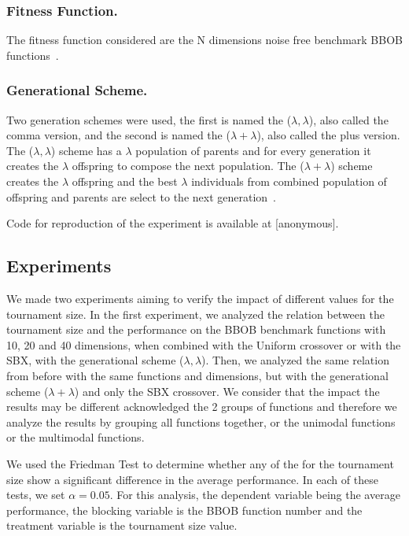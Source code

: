 \subsubsection*{Fitness Function.}
The fitness function considered are the N dimensions noise free benchmark BBOB functions~\cite{hansen2010real}.





\subsubsection*{Generational Scheme.}
Two generation schemes were used, the first is named the ($\lambda, \lambda$), also called the comma version, and the second is named the ($\lambda + \lambda$), also called the plus version. The ($\lambda, \lambda$) scheme has a $\lambda$ population of parents and for every generation it creates the $\lambda$ offspring to compose the next population. The ($\lambda + \lambda$) scheme creates the $\lambda$ offspring and the best $\lambda$ individuals from combined population of offspring and parents are select to the next generation~\cite{pilat2017parallel}.

Code for reproduction of the experiment is available at [anonymous].

\subsection{Experiments}\label{sec:experiment}
We made two experiments aiming to verify the impact of different values for the tournament size. In the first experiment, we analyzed the relation between the tournament size and the performance on the BBOB benchmark functions with 10, 20 and 40 dimensions, when combined with the Uniform crossover or with the SBX, with the generational scheme  ($\lambda, \lambda$). Then, we analyzed the same relation from before with the same functions and dimensions, but with the generational scheme  ($\lambda + \lambda$) and only the SBX crossover. We consider that the impact the results may be different acknowledged the 2 groups of functions and therefore we analyze the results by grouping all functions together, or the unimodal functions or the multimodal functions. 

We used the Friedman Test to determine whether any of the for the tournament size show a significant difference in the average performance. In each of these tests, we set $\alpha = 0.05$. For this analysis, the dependent variable being the average performance, the blocking variable is the BBOB function number and the treatment variable is the tournament size value.



